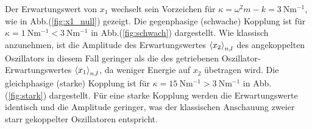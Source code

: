     Der Erwartungswert von $x_1$ wechselt sein Vorzeichen für $\kappa=\omega^2m-k=\SI{3}{\newton \meter^{-1}}$, wie in Abb.(\ref{fig:x1_null}) gezeigt.
    Die gegenphasige (schwache) Kopplung ist für $\kappa=\SI{1}{\newton \meter^{-1}}<\SI{3}{\newton \meter^{-1}}$ in Abb.(\ref{fig:schwach}) dargestellt. Wie klassisch anzunehmen, ist die Amplitude des Erwartungswertes $\braket{x_2}_{n,l}$ des angekoppelten Oszillators in diesem Fall geringer als die des getriebenen Oszillator-Erwartungswertes $\braket{x_1}_{n,l}$, da weniger Energie auf $x_2$ übetragen wird.
    Die gleichphasige (starke) Kopplung ist für $\kappa=\SI{15}{\newton \meter^{-1}}>\SI{3}{\newton \meter^{-1}}$ in Abb.(\ref{fig:stark}) dargestellt.
    Für eine starke Kopplung werden die Erwartungswerte identisch und die Amplitude geringer, was der klassischen Anschauung zweier starr gekoppelter Oszillatoren entspricht.
\iffalse
